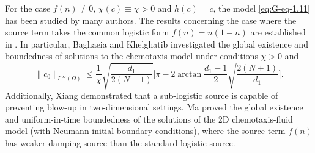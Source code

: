 \documentclass[reqno]{amsart}
\begin{document}
For the case $ f(n) \neq 0 $, $ \chi(c)\equiv\chi >0 $ and $ h(c) = c $, 
the model \eqref{eq:G-eq-1.11} has been studied by many authors. The results
concerning the case where the source term takes the common logistic form 
$ f(n) = n(1 - n) $ are established in \cite{ma-2,ma-14,ma-24}. In
particular, Baghaeia and Khelghatib \cite{ma-2} investigated the global existence and 
boundedness of solutions to the chemotaxis model under conditions 
$ \chi > 0$ and 
\[
 \|c_{0}\|_{L^{\infty}(\Omega)}
 \leq \frac{1}{\chi} \sqrt{\frac{d_1}{2(N+1)}} \Big[ \pi - 2\arctan \frac{d_1-1}{2}
\sqrt{\frac{2(N+1)}{d_1}}\Big].
\]
 Additionally, Xiang \cite{Xiang2018-2} demonstrated that a
sub-logistic source is capable of preventing blow-up in two-dimensional settings. 
Ma \cite{ma} proved the global existence and uniform-in-time boundedness of the 
solutions of the 2D chemotaxis-fluid model (with Neumann initial-boundary conditions), 
where the source term $f(n)$ has weaker damping source than
the standard logistic source.
\end{document}
